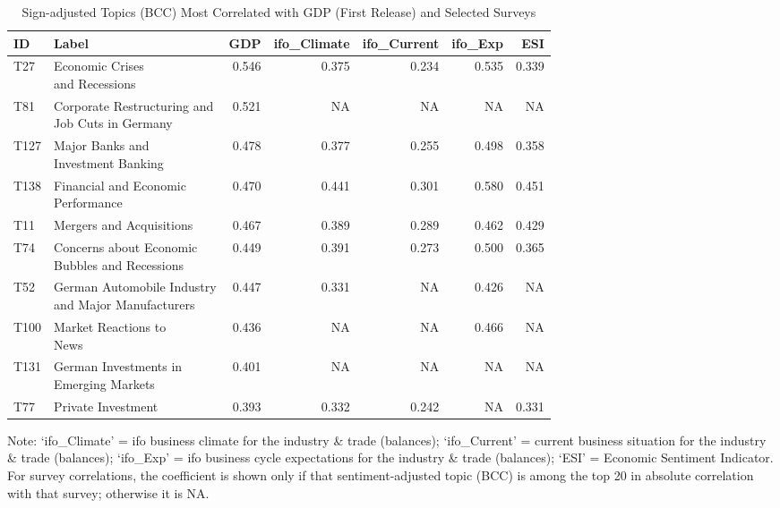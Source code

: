 \begin{table}[h!]
  \centering
  \begin{threeparttable}
    \footnotesize
    \renewcommand{\arraystretch}{1.3}
  \caption{Sign-adjusted Topics (BCC) Most Correlated with GDP (First Release) and Selected Surveys}
  \label{tab:cor_gdp_topics_bcc_2009_200_all}


\begin{tabular}{llrrrrr}
\hline
ID & Label & GDP & ifo\_Climate & ifo\_Current & ifo\_Exp & ESI\\
\hline
T27 & \makecell[tl]{ Economic Crises \\ and Recessions} & 0.546 & 0.375 & 0.234 & 0.535 & 0.339\\
T81 & \makecell[tl]{ Corporate Restructuring and \\ Job Cuts in Germany} & 0.521 & NA & NA & NA & NA\\
T127 & \makecell[tl]{ Major Banks and \\ Investment Banking} & 0.478 & 0.377 & 0.255 & 0.498 & 0.358\\
T138 & \makecell[tl]{ Financial and Economic \\ Performance} & 0.470 & 0.441 & 0.301 & 0.580 & 0.451\\
T11 & Mergers and Acquisitions & 0.467 & 0.389 & 0.289 & 0.462 & 0.429\\
\addlinespace
T74 & \makecell[tl]{ Concerns about Economic\\ Bubbles and Recessions} & 0.449 & 0.391 & 0.273 & 0.500 & 0.365\\
T52 & \makecell[tl]{ German Automobile Industry \\ and Major Manufacturers} & 0.447 & 0.331 & NA & 0.426 & NA\\
T100 & \makecell[tl]{ Market Reactions to \\News} & 0.436 & NA & NA & 0.466 & NA\\
T131 & \makecell[tl]{German Investments in \\ Emerging Markets} & 0.401 & NA & NA & NA & NA\\
T77 & Private Investment & 0.393 & 0.332 & 0.242 & NA & 0.331\\
\hline
\end{tabular}

    \begin{tablenotes}[flushleft]
      \small \item Note: ‘ifo\_Climate’ = ifo business climate for the industry \& trade (balances); ‘ifo\_Current’ = current business situation for the industry \& trade (balances); ‘ifo\_Exp’ = ifo business cycle expectations for the industry \& trade (balances); ‘ESI’ = Economic Sentiment Indicator. For survey correlations, the coefficient is shown only if that sentiment-adjusted topic (BCC) is among the top 20 in absolute correlation with that survey; otherwise it is NA.
    \end{tablenotes}
  \end{threeparttable}
\end{table}

